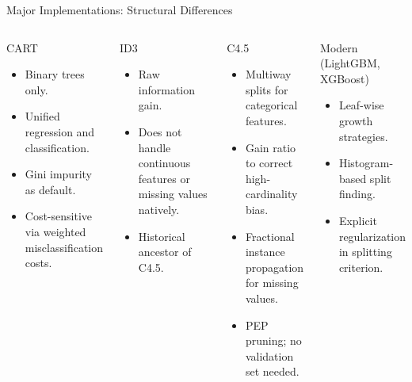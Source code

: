 \begin{frame}{Major Implementations: Structural Differences}
  \begin{columns}[t]
      \begin{block}{CART}
        \begin{itemize}
          \item \alert{Binary trees} only.
          \item Unified regression and classification.
          \item \alert{Gini impurity} as default.
          \item Cost-sensitive via weighted misclassification costs.
        \end{itemize}
      \end{block}
      \vspace{0.4em}
      \begin{block}{ID3}
        \begin{itemize}
          \item Raw \alert{information gain}.
          \item Does not handle continuous features or missing values natively.
          \item Historical ancestor of C4.5.
        \end{itemize}
      \end{block}
      \begin{block}{C4.5}
        \begin{itemize}
          \item \alert{Multiway splits} for categorical features.
          \item \alert{Gain ratio} to correct high-cardinality bias.
          \item Fractional instance propagation for \alert{missing values}.
          \item PEP pruning; no validation set needed.
        \end{itemize}
      \end{block}
      \vspace{0.4em}
      \begin{block}{Modern (LightGBM, XGBoost)}
        \begin{itemize}
          \item Leaf-wise growth strategies.
          \item Histogram-based split finding.
          \item Explicit regularization in splitting criterion.
        \end{itemize}
      \end{block}
  \end{columns}
\end{frame}

